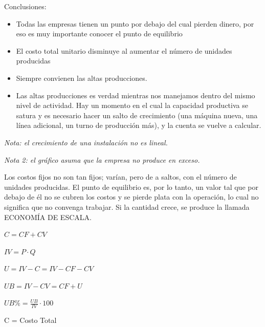 \documentclass[titlepage,a4paper]{article}
\begin{document}
Conclusiones:
\begin{itemize}
    \item Todas las empresas tienen un punto por debajo del cual pierden dinero, por eso es muy importante conocer el punto de equilibrio
    \item El costo total unitario disminuye al aumentar el número de unidades producidas
    \item Siempre convienen las altas producciones.
    \item Las altas producciones es verdad mientras nos manejamos dentro del mismo nivel de 
    actividad. Hay un momento en el cual la capacidad productiva se satura y es necesario hacer 
    un salto de crecimiento (una máquina nueva, una línea adicional, un turno de producción 
    más), y la cuenta se vuelve a calcular.
\end{itemize}

\textit{Nota: el crecimiento de una instalación no es lineal.}

\textit{Nota 2: el gráfico asuma que la empresa no produce en exceso.}



Los costos fijos no son tan fijos; varían, pero de a saltos, con el número de unidades producidas. El 
punto de equilibrio es, por lo tanto, un valor tal que por debajo de él no se cubren los costos y se pierde 
plata con la operación, lo cual no significa que no convenga trabajar. Si la cantidad crece, se produce la 
llamada ECONOMÍA DE ESCALA.

\begin{center}
\begin{math}
C = CF + CV
\end{math}
\medskip

\begin{math}
IV = P \cdot Q
\end{math}
\medskip

\begin{math}
U = IV - C = IV - CF - CV
\end{math}
\medskip

\begin{math}
UB = IV - CV = CF + U
\end{math}
\medskip

\begin{math}
UB\% = \frac{UB}{IV} \cdot 100
\end{math}
\end{center}

C = Costo Total
\end{document}
